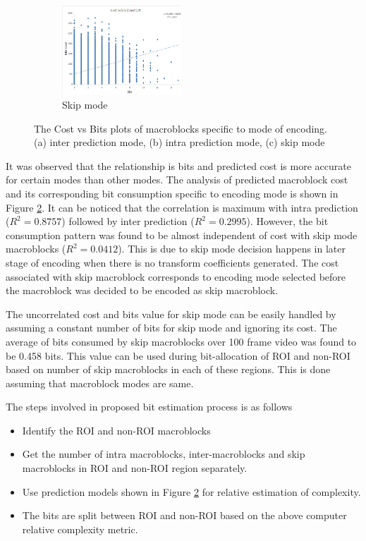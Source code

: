 \documentclass[11pt]{article} %
\begin{document}
\begin{figure}
	\begin{subfigure}[t]{\textwidth}
		\centering
		\includegraphics[width=0.49\textwidth]{CostVsBits/const_QP/CostvsBits_ConstQP_skip.png}
		\caption{Skip mode}
		\label{fig: Cost vs bits mode skip}
	\end{subfigure}
	\caption{The Cost vs Bits plots of macroblocks specific to mode of encoding. (a) inter prediction mode, (b) intra prediction mode, (c) skip mode}
	\label{fig: Cost vs bits mode}
\end{figure}

It was observed that the relationship is bits and predicted cost is more accurate for certain modes than other modes. The analysis of predicted macroblock cost and its corresponding bit consumption specific to encoding mode is shown in Figure \ref{fig: Cost vs bits mode}. It can be noticed that the correlation is maximum with intra prediction ($R^2 = 0.8757$) followed by inter prediction ($R^2 = 0.2995$). However, the bit consumption pattern was found to be almost independent of cost with skip mode macroblocks ($R^2 = 0.0412$). This is due to skip mode decision happens in later stage of encoding when there is no transform coefficients generated. The cost associated with skip macroblock corresponds to encoding mode selected before the macroblock was decided to be encoded as skip macroblock. 

The uncorrelated cost and bits value for skip mode can be easily handled by assuming a constant number of bits for skip mode and ignoring its cost. The average of bits consumed by skip macroblocks over 100 frame video was found to be 0.458 bits. This value can be used during bit-allocation of ROI and non-ROI based on number of skip macroblocks in each of these regions. This is done assuming that macroblock modes are same. 

The steps involved in proposed bit estimation process is as follows
\begin{itemize}
	\item Identify the ROI and non-ROI macroblocks
	\item Get the number of intra macroblocks, inter-macroblocks and skip macroblocks in ROI and non-ROI region separately.
	\item Use prediction models shown in Figure \ref{fig: Cost vs bits mode} for relative estimation of complexity.
	\item The bits are split between ROI and non-ROI based on the above computer relative complexity metric.
\end{itemize}
\end{document}
